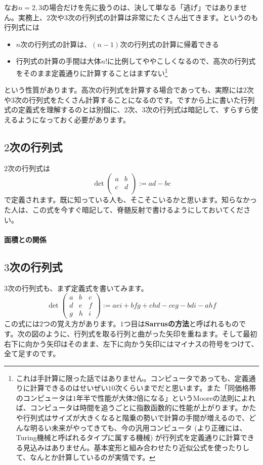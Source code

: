 なお$n = 2, 3$の場合だけを先に扱うのは、決して単なる「逃げ」ではありません。実務上、$2$次や$3$次の行列式の計算は非常にたくさん出てきます。というのも行列式には
\begin{itemize}
\item $n$次の行列式の計算は、$(n - 1)$次の行列式の計算に帰着できる
\item 行列式の計算の手間は大体$n!$に比例してややこしくなるので、高次の行列式をそのまま定義通りに計算することはまずない\footnote{これは手計算に限った話ではありません。コンピュータであっても、定義通りに計算できるのはせいぜい$10$次くらいまでだと思います。また「同価格帯のコンピュータは$1$年半で性能が大体$2$倍になる」というMooreの法則によれば、コンピュータは時間を追うごとに指数函数的に性能が上がります。かたや行列式はサイズが大きくなると階乗の勢いで計算の手間が増えるので、どんな明るい未来がやってきても、今の汎用コンピュータ (より正確には、Turing機械と呼ばれるタイプに属する機械) が行列式を定義通りに計算できる見込みはありません。基本変形と組み合わせたり近似公式を使ったりして、なんとか計算しているのが実情です。}
\end{itemize}
という性質があります。高次の行列式を計算する場合であっても、実際には$2$次や$3$次の行列式をたくさん計算することになるのです。ですから上に書いた行列式の定義式を理解するのとは別個に、$2$次、$3$次の行列式は暗記して、すらすら使えるようになっておく必要があります。

\subsection{$2$次の行列式}

$2$次の行列式は
\[
\det
\begin{pmatrix}
a & b \\
c & d \\
\end{pmatrix}
:= ad-bc
\]
で定義されます。既に知っている人も、そこそこいるかと思います。知らなかった人は、この式を今すぐ暗記して、脊髄反射で書けるようにしておいてください。

\paragraph{面積との関係}

\subsection{$3$次の行列式}

$3$次の行列式も、まず定義式を書いてみます。
\[
\det
\begin{pmatrix}
a & b & c \\
d & e & f \\
g & h & i
\end{pmatrix}
:=  aei + bfg + chd - ceg - bdi - ahf
\]
この式には$2$つの覚え方があります。$1$つ目は\textbf{Sarrusの方法}と呼ばれるものです。次の図のように、行列式を取る行列と曲がった矢印を重ねます。そして最初右下に向かう矢印はそのまま、左下に向かう矢印にはマイナスの符号をつけて、全て足すのです。

